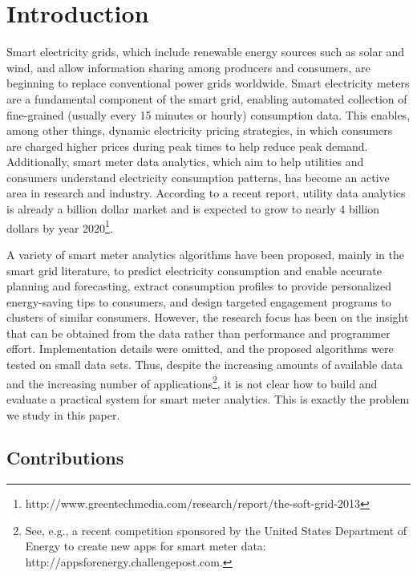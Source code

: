 \documentclass[prodmode,acmtods]{acmsmall}
\begin{document}
\maketitle

\section{Introduction}

Smart electricity grids, which include renewable energy sources such as solar and wind, and allow information sharing among producers and consumers, are beginning to replace conventional power grids worldwide.  Smart electricity meters are a fundamental component of the smart grid, enabling automated collection of fine-grained (usually every 15 minutes or hourly) consumption data.  This enables, among other things, dynamic electricity pricing strategies, in which consumers are charged higher prices during peak times to help reduce peak demand.  Additionally, smart meter data analytics, which aim to help utilities and consumers understand electricity consumption patterns, has become an active area in research and industry.  According to a recent report, utility data analytics is already a billion dollar market and is expected to grow to nearly 4 billion dollars by year 2020\footnote{http://www.greentechmedia.com/research/report/the-soft-grid-2013}.

A variety of smart meter analytics algorithms have been proposed, mainly in the smart grid literature, to predict electricity consumption and enable accurate planning and forecasting, extract consumption profiles to provide personalized energy-saving tips to consumers, and design targeted engagement programs to clusters of similar consumers.  However, the research focus has been on the insight that can be obtained from the data rather than performance and programmer effort.  Implementation details were omitted, and the proposed algorithms were tested on small data sets.  
Thus, despite the increasing amounts of available data and the increasing number of applications\footnote{
See, e.g., a recent competition sponsored by the United States Department of Energy to create new apps for smart meter data: http://appsforenergy.challengepost.com.
}, it is not clear how to build and evaluate a practical system for smart meter analytics.  This is exactly the problem we study in this paper.

\subsection{Contributions}
\end{document}
